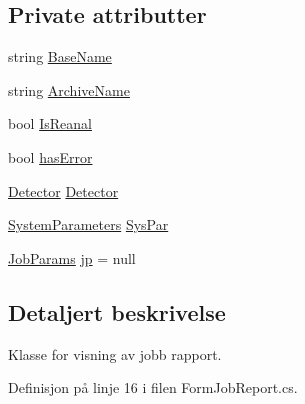 \subsection*{Private attributter}
\begin{DoxyCompactItemize}
\item 
string \hyperlink{class_scintilab_1_1_form_job_report_ae2edaad73f9347d9cbc70299ea55c8e4}{Base\+Name}
\item 
string \hyperlink{class_scintilab_1_1_form_job_report_a6befd8e22fc03d7db559bc5819b9001a}{Archive\+Name}
\item 
bool \hyperlink{class_scintilab_1_1_form_job_report_ad6eadf59048ecf2909b4e6c0fd48751f}{Is\+Reanal}
\item 
bool \hyperlink{class_scintilab_1_1_form_job_report_aa9d718d9966b2d6263142d811c4690ef}{has\+Error}
\item 
\hyperlink{class_scintilab_1_1_detector}{Detector} \hyperlink{class_scintilab_1_1_form_job_report_acfd377f5214f1677dbfcee75e848fd3e}{Detector}
\item 
\hyperlink{class_scintilab_1_1_system_parameters}{System\+Parameters} \hyperlink{class_scintilab_1_1_form_job_report_a9d69b66d54f46318d0cd060dd22ef920}{Sys\+Par}
\item 
\hyperlink{class_scintilab_1_1_job_params}{Job\+Params} \hyperlink{class_scintilab_1_1_form_job_report_abf5ab85e5b06729f1494a9e1c6877d7e}{jp} = null
\end{DoxyCompactItemize}


\subsection{Detaljert beskrivelse}
Klasse for visning av jobb rapport. 

Definisjon på linje 16 i filen Form\+Job\+Report.\+cs.



